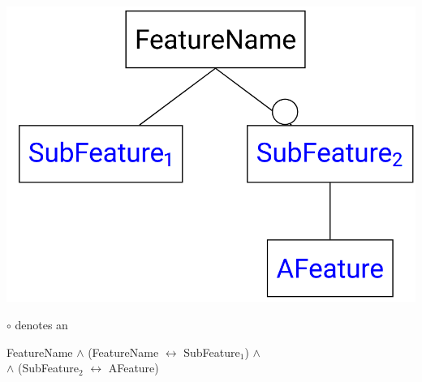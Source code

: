 \documentclass[
    ../../Software_Engineering_Summary.tex,
]
{subfiles}
\begin{document}
\begin{minipage}
    [c]{0.35\textwidth}
    \centering
    \includegraphics[width = \textwidth]{Pics/12/FeatureDiagramOptional.png}
\end{minipage}
\begin{minipage}
    [c]{0.65\textwidth}
    $\circ$ denotes an 

    \begin{defbox}
        FeatureName $\land$ (FeatureName $\leftrightarrow$ SubFeature$_1$) $\land$\\  $\land$ (SubFeature$_2$ $\leftrightarrow$ AFeature)
    \end{defbox}
\end{minipage}
\end{document}

